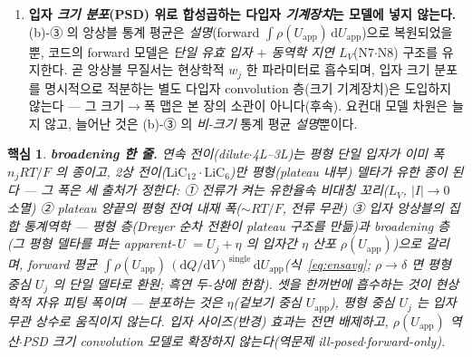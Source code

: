 \documentclass[11pt,a4paper]{article}
\newtheorem*{keybox}{핵심}
\newcommand{\dd}{\mathrm{d}}
\newcommand{\app}{\mathrm{app}}
\begin{document}
\begin{enumerate}[label=(\roman*),leftmargin=2.2em,itemsep=2.5pt]
측정하므로\cite{park2021}, 분포하는 것은 그 중심이 아니라 겉보기 전위의 폭 $\rho(U_\app)$ 곧 과전압 $\eta$ 의
산포다(분포는 폭을 \emph{넓힐} 뿐 평형 중심 $U_j$ 를 옮기지 않는다).
\item \textbf{입자 \emph{크기 분포}(PSD) 위로 합성곱하는 다입자 \emph{기계장치}는 모델에 넣지 않는다.} (b)-③ 의 앙상블
통계 평균은 \emph{설명}(forward $\int\rho(U_\app)\,\dd U_\app$)으로 복원되었을 뿐, 코드의 forward 모델은 \emph{단일
유효 입자 $+$ 동역학 지연 $L_V$}(N7$\cdot$N8) 구조를 유지한다. 곧 앙상블 무질서는 현상학적 $w_j$ 한 파라미터로 흡수되며,
입자 크기 분포를 명시적으로 적분하는 별도 다입자 convolution 층(크기 기계장치)은 도입하지 않는다 — 그 크기$\to$폭 맵은
본 장의 소관이 아니다(후속). 요컨대 모델 차원은 늘지 않고, 늘어난 것은 (b)-③ 의 \emph{비-크기} 통계 평균 \emph{설명}뿐이다.
\end{enumerate}

\begin{keybox}
\textbf{broadening 한 줄.} 연속 전이(dilute$\cdot$4L--3L)는 평형 단일 입자가 \emph{이미} 폭 $n_jRT/F$ 의 종이고,
2상 전이($\mathrm{LiC_{12}}\cdot\mathrm{LiC_6}$)만 평형(plateau 내부) 델타가 유한 종이 된다 — 그 폭은 \emph{세}
출처가 정한다: ① \emph{전류가 켜는} 유한율속 비대칭 꼬리($L_V$, $|I|\!\to\!0$ 소멸) ② plateau 양끝의 \emph{평형 잔여}
내재 폭($\sim RT/F$, 전류 무관) ③ \emph{입자 앙상블}의 집합 통계역학 — 평형 층(Dreyer 순차 전환이 \emph{plateau 구조}를
만듦)과 broadening 층(그 평형 델타를 펴는 \emph{apparent-U $=U_j+\eta$} 의 입자간 $\eta$ 산포 $\rho(U_\app)$)으로 갈리며,
forward 평균 $\int\rho(U_\app)\,(\dd Q/\dd V)^\mathrm{single}\,\dd U_\app$(식~\eqref{eq:ensavg}; $\rho\!\to\!\delta$ 면
평형 중심 $U_j$ 의 단일 델타로 환원; 흑연 두-상에 한함). 셋을 한꺼번에 흡수하는 것이 \emph{현상학적 자유 피팅 폭}이며 —
\emph{분포하는 것은 $\eta$(겉보기 중심 $U_\app$), 평형 중심 $U_j$ 는 입자 무관 상수로 움직이지 않는다}. \emph{입자
사이즈(반경) 효과는 전면 배제}하고, $\rho(U_\app)$ 역산$\cdot$PSD 크기 convolution 모델로 확장하지 않는다(역문제
ill-posed$\cdot$forward-only).
\end{keybox}
\end{document}
